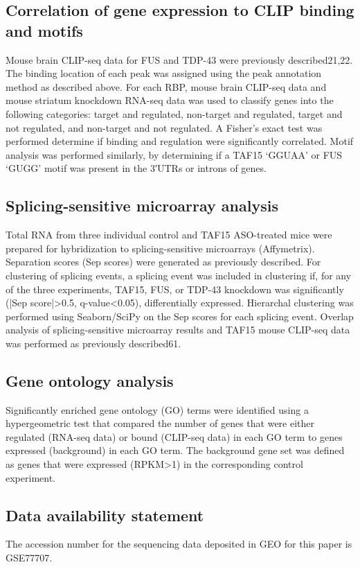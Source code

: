 \subsection{Correlation of gene expression to CLIP binding and motifs}
Mouse brain CLIP-seq data for FUS and TDP-43 were previously described21,22. The binding location of each peak was assigned using the peak annotation method as described above. For each RBP, mouse brain CLIP-seq data and mouse striatum knockdown RNA-seq data was used to classify genes into the following categories: target and regulated, non-target and regulated, target and not regulated, and non-target and not regulated. A Fisher’s exact test was performed determine if binding and regulation were significantly correlated. Motif analysis was performed similarly, by determining if a TAF15 ‘GGUAA’ or FUS ‘GUGG’ motif was present in the 3′UTRs or introns of genes.

\subsection{Splicing-sensitive microarray analysis}
Total RNA from three individual control and TAF15 ASO-treated mice were prepared for hybridization to splicing-sensitive microarrays (Affymetrix). Separation scores (Sep scores) were generated as previously described\cite{Huelga2012}. For clustering of splicing events, a splicing event was included in clustering if, for any of the three experiments, TAF15, FUS, or TDP-43 knockdown was significantly (|Sep score|>0.5, q-value<0.05), differentially expressed. Hierarchal clustering was performed using Seaborn/SciPy on the Sep scores for each splicing event. Overlap analysis of splicing-sensitive microarray results and TAF15 mouse CLIP-seq data was performed as previously described61.

\subsection{Gene ontology analysis}
Significantly enriched gene ontology (GO) terms were identified using a hypergeometric test that compared the number of genes that were either regulated (RNA-seq data) or bound (CLIP-seq data) in each GO term to genes expressed (background) in each GO term. The background gene set was defined as genes that were expressed (RPKM>1) in the corresponding control experiment.

\subsection{Data availability statement}
The accession number for the sequencing data deposited in GEO for this paper is GSE77707.

